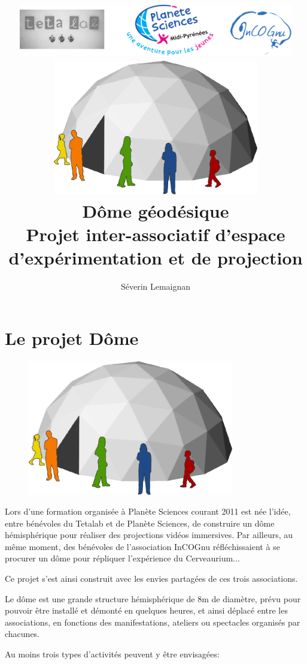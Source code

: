 \documentclass[a4paper,12pt]{report}
\title{
	\includegraphics[width=12cm]{logos.pdf}\\
	\vfill
	\includegraphics[width=9cm]{general.pdf}\\
	\vspace{3em}
	\LARGE{\textbf{Dôme géodésique}}\\[1cm]
	\large{Projet inter-associatif d'espace d'expérimentation et de projection}\\[1cm]
	\vfill
}
\author{
Séverin Lemaignan
}
\begin{document}

\maketitle

\tableofcontents


\chapter{Le projet Dôme}

\begin{figure}[!h]
\centering
\includegraphics[width=9cm]{general.pdf}
\end{figure}


Lors d'une formation organisée à Planète Sciences courant 2011 est née l'idée,
entre bénévoles du Tetalab et de Planète Sciences, de construire un dôme
hémisphérique pour réaliser des projections vidéos immersives. Par ailleurs, au
même moment, des bénévoles de l'association InCOGnu réfléchissaient à se
procurer un dôme pour répliquer l'expérience du Cerveaurium...

Ce projet s'est ainsi construit avec les envies partagées de ces trois
associations.

Le dôme est une grande structure hémisphérique de 8m de diamètre, prévu pour
pouvoir être installé et démonté en quelques heures, et ainsi déplacé entre les
associations, en fonctions des manifestations, ateliers ou spectacles organisés
par chacunes.

Au moins trois types d'activités peuvent y être envisagées:
\end{document}
